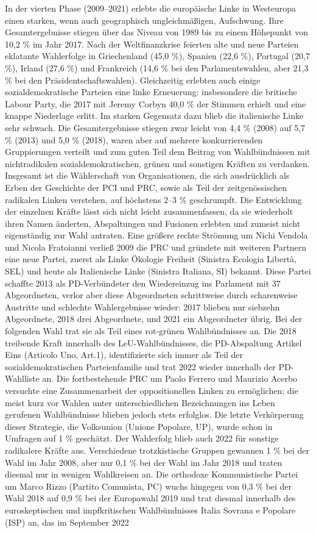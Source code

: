 \begin{multicols*}{2}
In der vierten Phase (2009–2021) erlebte die europäische Linke in Westeuropa einen starken, wenn auch geographisch ungleichmäßigen, Aufschwung. Ihre Gesamtergebnisse stiegen über das Niveau von 1989 bis zu einem Höhepunkt von 10,2 \% im Jahr 2017. Nach der Weltfinanzkrise feierten alte und neue Parteien eklatante Wahlerfolge in Griechenland (45,0 \%), Spanien (22,6 \%), Portugal (20,7 \%), Irland (27,6 \%) und Frankreich (14,6 \% bei den Parlamentswahlen, aber 21,3 \% bei den Präsidentschaftswahlen). Gleichzeitig erlebten auch einige sozialdemokratische Parteien eine linke Erneuerung: insbesondere die britische Labour Party, die 2017 mit Jeremy Corbyn 40,0 \% der Stimmen erhielt und eine knappe Niederlage erlitt. Im starken Gegensatz dazu blieb die italienische Linke sehr schwach. Die Gesamtergebnisse stiegen zwar leicht von 4,4 \% (2008) auf 5,7 \% (2013) und 5,0 \% (2018), waren aber auf mehrere konkurrierenden Gruppierungen verteilt und zum guten Teil dem Beitrag von Wahlbündnissen mit nichtradikalen sozialdemokratischen, grünen und sonstigen Kräften zu verdanken. Insgesamt ist die Wählerschaft von Organisationen, die sich ausdrücklich als Erben der Geschichte der PCI und PRC, sowie als Teil der zeitgenössischen radikalen Linken verstehen, auf höchstens 2–3 \% geschrumpft. Die Entwicklung der einzelnen Kräfte lässt sich nicht leicht zusammenfassen, da sie wiederholt ihren Namen änderten, Abspaltungen und Fusionen erlebten und zumeist nicht eigenständig zur Wahl antraten. Eine größere rechte Strömung um Nichi Vendola und Nicola Fratoianni verließ 2009 die PRC und gründete mit weiteren Partnern eine neue Partei, zuerst als Linke Ökologie Freiheit (Sinistra Ecologia Libertà, SEL) und heute als Italienische Linke (Sinistra Italiana, SI) bekannt. Diese Partei schaffte 2013 als PD-Verbündeter den Wiedereinzug ins Parlament mit 37 Abgeordneten, verlor aber diese Abgeordneten schrittweise durch scharenweise Austritte und schlechte Wahlergebnisse wieder: 2017 blieben nur siebzehn Abgeordnete, 2018 drei Abgeordnete, und 2021 ein Abgeordneter übrig. Bei der folgenden Wahl trat sie als Teil eines rot-grünen Wahlbündnisses an. Die 2018 treibende Kraft innerhalb des LeU-Wahlbündnisses, die PD-Abspaltung Artikel Eins (Articolo Uno, Art.1), identifizierte sich immer als Teil der sozialdemokratischen Parteienfamilie und trat 2022 wieder innerhalb der PD-Wahlliste an. Die fortbestehende PRC um Paolo Ferrero und Maurizio Acerbo versuchte eine Zusammenarbeit der oppositionellen Linken zu ermöglichen; die meist kurz vor Wahlen unter unterschiedlichen Bezeichnungen ins Leben gerufenen Wahlbündnisse blieben jedoch stets erfolglos. Die letzte Verkörperung dieser Strategie, die Volksunion (Unione Popolare, UP), wurde schon in Umfragen auf 1 \% geschätzt. Der Wahlerfolg blieb auch 2022 für sonstige radikalere Kräfte aus. Verschiedene trotzkistische Gruppen gewannen 1 \% bei der Wahl im Jahr 2008, aber nur 0,1 \% bei der Wahl im Jahr 2018 und traten diesmal nur in wenigen Wahlkreisen an. Die orthodoxe Kommunistische Partei um Marco Rizzo (Partito Comunista, PC) wuchs hingegen von 0,3 \% bei der Wahl 2018 auf 0,9 \% bei der Europawahl 2019 und trat diesmal innerhalb des euroskeptischen und impfkritischen Wahlbündnisses Italia Sovrana e Popolare (ISP) an, das im September 2022 
\end{multicols*}
